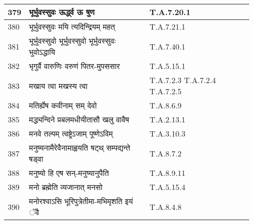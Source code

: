 \documentclass[17pt]{extarticle}
\begin{document}
\begin{longtable}{||p{0.4in}||p{4.9in}||p{0.9in}||}
    \hline
        
    379 & भूर्भुवस्सुवः ऊर्द्ध्व ऊ षुण & T.A.7.20.1       \\
    
    \hline
        
    380 & भूर्भुवस्सुवः मयि त्यदिन्द्रियम् महत् & T.A.7.21.1       \\
    
    \hline
        
    381 & भूर्भुवस्सुवो भूर्भुवस्सुवो भूर्भुवस्सुवः भुवोऽद्धायि & T.A.7.40.1       \\
    
    \hline
        
    382 & भृगुर्वै वारुणिः वरुणं पितर{-}मुपससार & T.A.5.15.1       \\
    
    \hline
        
    383 & मखाय त्वा मखस्य त्वा & T.A.7.2.3 T.A.7.2.4 T.A.7.2.5       \\
    
    \hline
        
    384 & मतिर्ह्येष कवीनाम् सम् देवो & T.A.8.6.9       \\
    
    \hline
        
    385 & मद्ध्यन्दिने प्रबलमधीयीतासौ खलु वावैष & T.A.2.13.1       \\
    
    \hline
        
    386 & मनवे तल्पम् त्वष्ट्रेऽजाम् पूष्णेऽविम् & T.A.3.10.3       \\
    
    \hline
        
    387 & मनुष्यनामैरेवैनामाह्वयति षट्थ् सम्पद्यन्ते षड्वा & T.A.8.7.2       \\
    
    \hline
        
    388 & मनुष्यो हि एष सन्{-}मनुष्यानुपैति & T.A.8.9.11       \\
    
    \hline
        
    389 & मनो ब्रह्मेति व्यजानात् मनसो & T.A.5.15.4       \\
    
    \hline
        
    390 & मनोरश्वाऽसि भूरिपुत्रेतीमा{-}मभिमृशति इयं ॅवै & T.A.8.4.8       \\
    
    \hline
        

\end{longtable}
\end{document}
